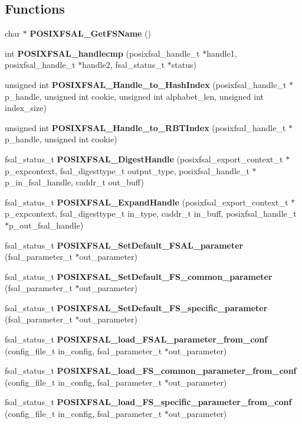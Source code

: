 \subsection*{Functions}
\begin{DoxyCompactItemize}
\item 
char $\ast$ {\bfseries POSIXFSAL\_\-GetFSName} ()\label{fsal__tools_8c_a324a82f014b71f45f4098fb75ea5c4da}

\item 
int {\bf POSIXFSAL\_\-handlecmp} (posixfsal\_\-handle\_\-t $\ast$handle1, posixfsal\_\-handle\_\-t $\ast$handle2, fsal\_\-status\_\-t $\ast$status)
\item 
unsigned int {\bf POSIXFSAL\_\-Handle\_\-to\_\-HashIndex} (posixfsal\_\-handle\_\-t $\ast$p\_\-handle, unsigned int cookie, unsigned int alphabet\_\-len, unsigned int index\_\-size)
\item 
unsigned int {\bfseries POSIXFSAL\_\-Handle\_\-to\_\-RBTIndex} (posixfsal\_\-handle\_\-t $\ast$p\_\-handle, unsigned int cookie)\label{fsal__tools_8c_aecf3b3cd8dbb5924833203c5b24b8b0d}

\item 
fsal\_\-status\_\-t {\bf POSIXFSAL\_\-DigestHandle} (posixfsal\_\-export\_\-context\_\-t $\ast$p\_\-expcontext, fsal\_\-digesttype\_\-t output\_\-type, posixfsal\_\-handle\_\-t $\ast$p\_\-in\_\-fsal\_\-handle, caddr\_\-t out\_\-buff)
\item 
fsal\_\-status\_\-t {\bf POSIXFSAL\_\-ExpandHandle} (posixfsal\_\-export\_\-context\_\-t $\ast$p\_\-expcontext, fsal\_\-digesttype\_\-t in\_\-type, caddr\_\-t in\_\-buff, posixfsal\_\-handle\_\-t $\ast$p\_\-out\_\-fsal\_\-handle)
\item 
fsal\_\-status\_\-t {\bf POSIXFSAL\_\-SetDefault\_\-FSAL\_\-parameter} (fsal\_\-parameter\_\-t $\ast$out\_\-parameter)
\item 
fsal\_\-status\_\-t {\bfseries POSIXFSAL\_\-SetDefault\_\-FS\_\-common\_\-parameter} (fsal\_\-parameter\_\-t $\ast$out\_\-parameter)\label{fsal__tools_8c_a6cd1e0339345aed1e88242605663d40e}

\item 
fsal\_\-status\_\-t {\bfseries POSIXFSAL\_\-SetDefault\_\-FS\_\-specific\_\-parameter} (fsal\_\-parameter\_\-t $\ast$out\_\-parameter)\label{fsal__tools_8c_a50497a5e37e20bce50d878fadca55d0d}

\item 
fsal\_\-status\_\-t {\bf POSIXFSAL\_\-load\_\-FSAL\_\-parameter\_\-from\_\-conf} (config\_\-file\_\-t in\_\-config, fsal\_\-parameter\_\-t $\ast$out\_\-parameter)
\item 
fsal\_\-status\_\-t {\bfseries POSIXFSAL\_\-load\_\-FS\_\-common\_\-parameter\_\-from\_\-conf} (config\_\-file\_\-t in\_\-config, fsal\_\-parameter\_\-t $\ast$out\_\-parameter)\label{fsal__tools_8c_a2ae9686d74bc463094c554ab923b09bb}

\item 
fsal\_\-status\_\-t {\bfseries POSIXFSAL\_\-load\_\-FS\_\-specific\_\-parameter\_\-from\_\-conf} (config\_\-file\_\-t in\_\-config, fsal\_\-parameter\_\-t $\ast$out\_\-parameter)\label{fsal__tools_8c_a19624abbe83b7d54b423ae11541ebe05}

\end{DoxyCompactItemize}


